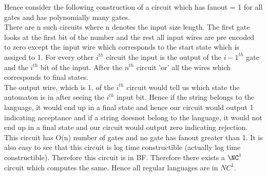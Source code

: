 \documentclass[12pt]{exam}
\begin{document}
\begin{questions}
\begin{solution}
Hence consider the following construction of a circuit which has fanout = 1
for all gates and has polynomially many gates.\\
There are n such circuits where n denotes the input size length. The
first gate looks at the first bit of the number and the rest
all input wires are pre encoded to zero except the input wire
which corresponds to the start state which is assiged to 1.
For every other $i^{th}$ circuit the input is the output of
the ${i-1}^{th}$ gate and the $i^{th}$ bit of the input. After
the $n^{th}$ circuit 'or' all the wires which corresponds to final states.\\
The output wire, which is 1, of the $i^{th}$ circuit would tell us which state the
automaton is in after seeing the $i^{th}$ input bit. Hence if
the string belongs to the language, it would end up in a final state and hence
our circuit would output 1 indicating acceptance and if a string
doesnot belong to the language, it would not end up in a final state
and our circuit would output zero indicating rejection.\\

This circuit has O(n) number of gates and no gate has fanout greater than 1.
It is also easy to see that this circuit is log time constructible
(actually log time constructible).
Therefore this circuit is in BF. Therefore there exists a $\NC^1$
circuit which computes the same. Hence all regular languages are in
${NC}^1$.


\end{solution}



\end{questions}
\end{document}
